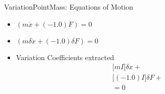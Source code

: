 VariationPointMass: Equations of Motion
\begin{itemize}
\item $(m\ddot{x}+(-1.0)F)=0$
\item $(m\delta \ddot{x}+(-1.0)\delta F)=0$
\item Variation Coefficients extracted
\begin{gather}
\Big[m I\Big]\delta \ddot{x}+\nonumber\\
\Big[(-1.0) I\Big]\delta F+\nonumber\\
=0
\end{gather}
\end{itemize}